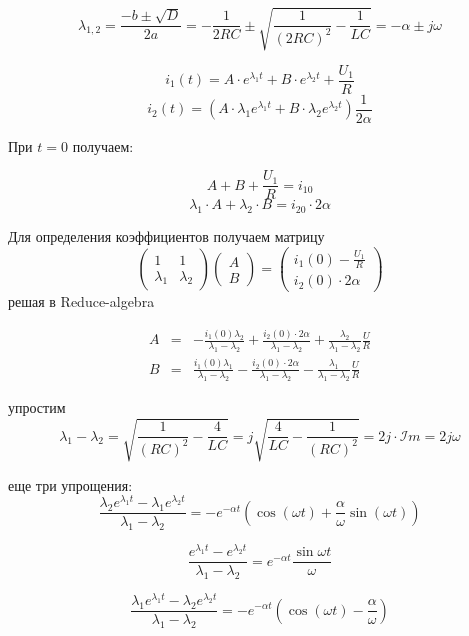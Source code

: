 \documentclass[a4paper,12pt]{article}
\begin{document}
$$
\lambda_{1,2} = \frac{-b \pm \sqrt{D}}{2a} = -\frac{1}{2RC} \pm \sqrt{\frac{1}{(2RC)^2}- \frac{1}{LC}}
= -\alpha \pm j\omega
$$

$$
i_1(t) = A\cdot e^{\lambda_1 t} + B\cdot e^{\lambda_2 t} + \frac{U_1}{R}
$$
$$
i_2(t) = \left(A\cdot \lambda_1e^{\lambda_1 t} + B\cdot \lambda_2e^{\lambda_2 t}\right)\frac{1}{2\alpha}
$$



При $t=0$ получаем:

$$
A + B + \frac{U_1}{R} = i_{10}
$$
$$
\lambda_1 \cdot A + \lambda_2 \cdot B = i_{20}\cdot2\alpha
$$



Для определения коэффициентов получаем матрицу
$$
\left(
\begin{array}{cc}
  1 & 1 \\[1.5mm] 
  \lambda_1 & \lambda_2 
\end{array}
\right)\left(
\begin{array}{c}
  A\\[1.5mm]
  B 
\end{array}  
\right)=\left(
\begin{array}{c}
	i_1(0) - \frac{U_1}{R}\\[1.5mm]
  i_2(0) \cdot 2\alpha
\end{array}
\right)
$$
решая в Reduce-algebra

$$
\begin{array}{ccl}
	A&=&-\frac{i_1(0)\lambda_2}{\lambda_1-\lambda_2} + \frac{i_2(0)\cdot2\alpha}{\lambda_1-\lambda_2} + \frac{\lambda_2}{\lambda_1-\lambda_2}\frac{U}{R}\\[1.5mm]
	B&=&\frac{i_1(0)\lambda_1}{\lambda_1-\lambda_2} - \frac{i_2(0)\cdot2\alpha}{\lambda_1-\lambda_2} - \frac{\lambda_1}{\lambda_1-\lambda_2}\frac{U}{R}
\end{array}
$$

упростим 
$$
\lambda_1 - \lambda_2 = \sqrt{\frac{1}{(RC)^2} - \frac{4}{LC}} = j \sqrt{\frac{4}{LC} - \frac{1}{(RC)^2}} = 2j\cdot \mathcal{I}m = 2j\omega
$$




еще три упрощения:
$$
\frac{\lambda_2e^{\lambda_1t} - \lambda_1e^{\lambda_2t}}{\lambda_1-\lambda_2} = -e^{-\alpha t}
\left(\cos(\omega t) + \frac{\alpha}{\omega} \sin(\omega t)\right)
$$

$$
\frac{e^{\lambda_1t} - e^{\lambda_2t}}{\lambda_1-\lambda_2} = e^{-\alpha t}
\frac{\sin\omega t}{\omega}
$$

$$
\frac{\lambda_1e^{\lambda_1t} - \lambda_2e^{\lambda_2t}}{\lambda_1-\lambda_2} = -e^{-\alpha t}
\left(\cos(\omega t) - \frac{\alpha}{\omega}\right)
$$
\end{document}
